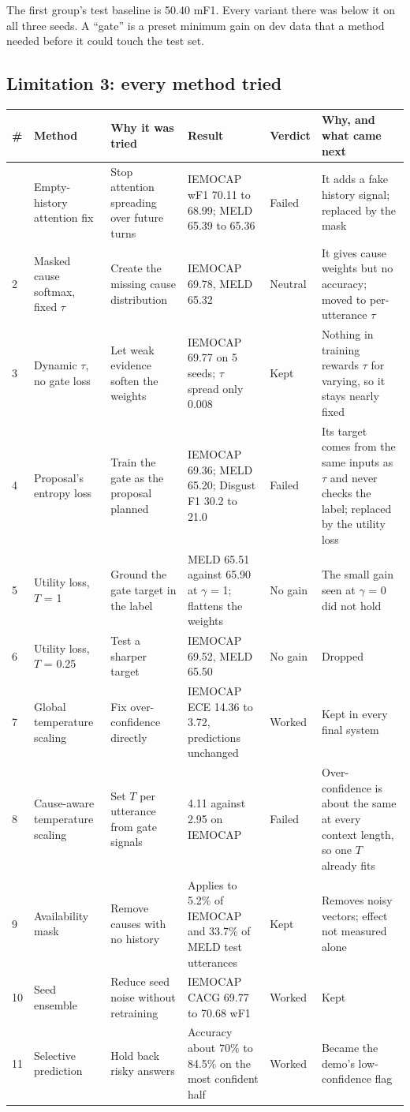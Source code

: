 \documentclass[11pt,a4paper]{article}
\begin{document}
The first group's test baseline is 50.40 mF1. Every variant there was below it on all three seeds. A ``gate'' is a preset minimum gain on dev data that a method needed before it could touch the test set.

\subsection{Limitation 3: every method tried}
\label{sec:abl-l3}

{\footnotesize
\begin{longtable}{L{0.4cm}L{2.5cm}L{2.6cm}L{3.8cm}L{1.4cm}L{4.3cm}}
\toprule
\# & Method & Why it was tried & Result & Verdict & Why, and what came next \\
\midrule
\endhead
\bottomrule
{} & Empty-history attention fix & Stop attention spreading over future turns & IEMOCAP wF1 70.11 to 68.99; MELD 65.39 to 65.36 & Failed & It adds a fake history signal; replaced by the mask \\
2 & Masked cause softmax, fixed $\tau$ & Create the missing cause distribution & IEMOCAP 69.78, MELD 65.32 & Neutral & It gives cause weights but no accuracy; moved to per-utterance $\tau$ \\
3 & Dynamic $\tau$, no gate loss & Let weak evidence soften the weights & IEMOCAP 69.77 on 5 seeds; $\tau$ spread only 0.008 & Kept & Nothing in training rewards $\tau$ for varying, so it stays nearly fixed \\
4 & Proposal's entropy loss & Train the gate as the proposal planned & IEMOCAP 69.36; MELD 65.20; Disgust F1 30.2 to 21.0 & Failed & Its target comes from the same inputs as $\tau$ and never checks the label; replaced by the utility loss \\
5 & Utility loss, $T$ = 1 & Ground the gate target in the label & MELD 65.51 against 65.90 at $\gamma$ = 1; flattens the weights & No gain & The small gain seen at $\gamma$ = 0 did not hold \\
6 & Utility loss, $T$ = 0.25 & Test a sharper target & IEMOCAP 69.52, MELD 65.50 & No gain & Dropped \\
7 & Global temperature scaling & Fix over-confidence directly & IEMOCAP ECE 14.36 to 3.72, predictions unchanged & Worked & Kept in every final system \\
8 & Cause-aware temperature scaling & Set $T$ per utterance from gate signals & 4.11 against 2.95 on IEMOCAP & Failed & Over-confidence is about the same at every context length, so one $T$ already fits \\
9 & Availability mask & Remove causes with no history & Applies to 5.2\% of IEMOCAP and 33.7\% of MELD test utterances & Kept & Removes noisy vectors; effect not measured alone \\
10 & Seed ensemble & Reduce seed noise without retraining & IEMOCAP CACG 69.77 to 70.68 wF1 & Worked & Kept \\
11 & Selective prediction & Hold back risky answers & Accuracy about 70\% to 84.5\% on the most confident half & Worked & Became the demo's low-confidence flag \\
\end{longtable}
}
\end{document}
